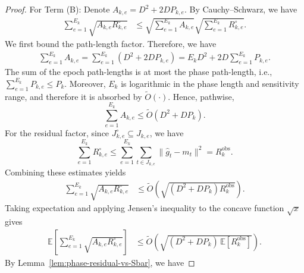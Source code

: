 \documentclass[journal,onecolumn]{IEEEtran}
\theoremstyle{plain}
\theoremstyle{definition}
\theoremstyle{remark}
\begin{document}
{\begin{proof}
For Term (B): 
Denote $A_{k,e}=D^2 + 2D P_{k,e}$. By
Cauchy--Schwarz, we have
\begin{equation*}
\begin{aligned}
    \sum_{e=1}^{E_k}
    \sqrt{A_{k,e}R_{k,e}^{\circ}}
    &\le
    \sqrt{
        \sum_{e=1}^{E_k}A_{k,e}
    }
    \sqrt{
        \sum_{e=1}^{E_k}R_{k,e}^{\circ}
    }.
\end{aligned}
\end{equation*}
We first bound the path-length factor. Therefore, we have
\begin{equation*}
\begin{aligned}
    \sum_{e=1}^{E_k}A_{k,e}=
    \sum_{e=1}^{E_k}(D^2+2DP_{k,e})=
    E_kD^2+2D\sum_{e=1}^{E_k}P_{k,e}.
\end{aligned}
\end{equation*}
The sum of the epoch path-lengths is at most the phase path-length, i.e.,  
$\sum_{e=1}^{E_k}P_{k,e}\le P_k$. Moreover, $E_k$ is logarithmic in the phase length and sensitivity range, and
therefore it is absorbed by $\widetilde O(\cdot)$. Hence, pathwise,
\begin{equation*}
    \sum_{e=1}^{E_k}A_{k,e}
    \le
    \widetilde O(D^2+DP_k).
\end{equation*}
For the residual factor, since $J_{k,e}^{\circ}\subseteq J_{k,e}$, we have
\begin{equation*}
    \sum_{e=1}^{E_k}R_{k,e}^{\circ}
    \le
    \sum_{e=1}^{E_k}
    \sum_{t\in J_{k,e}}\|\hat g_t-m_t\|^2
    =
    R_k^{\mathrm{obs}}.
\end{equation*}
Combining these estimates yields
\begin{equation*}
\begin{aligned}
    \sum_{e=1}^{E_k}
    \sqrt{A_{k,e}R_{k,e}^{\circ}}
    &\le
    \widetilde O\left(
        \sqrt{(D^2+DP_k)R_k^{\mathrm{obs}}}
    \right).
\end{aligned}
\end{equation*}
Taking expectation and applying Jensen's inequality to the concave function
$\sqrt{x}$ gives
\begin{equation*}
\begin{aligned}
    \mathbb E\left[
        \sum_{e=1}^{E_k}
        \sqrt{A_{k,e}R_{k,e}^{\circ}}
    \right]
    &\le
    \widetilde O\left(
        \sqrt{
            (D^2+DP_k)\,
            \mathbb E[R_k^{\mathrm{obs}}]
        }
    \right).
\end{aligned}
\end{equation*}
By Lemma~\ref{lem:phase-residual-vs-Sbar}, we have

\end{proof}}
\end{document}
